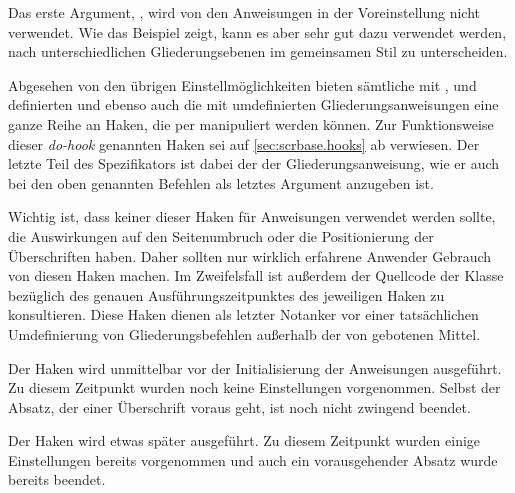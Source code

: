 Das erste Argument, , wird von den Anweisungen in der
Voreinstellung nicht verwendet. Wie das Beispiel zeigt, kann es aber sehr gut
dazu verwendet werden, nach unterschiedlichen Gliederungsebenen im gemeinsamen
Stil  zu unterscheiden.%
\EndIndexGroup


\begin{Declaration}
%
%
%
%
%
%
\end{Declaration}
%
Abgesehen von den übrigen Einstellmöglichkeiten bieten sämtliche mit
,
 und
 definierten und ebenso auch die
mit  umdefinierten
Gliederungsanweisungen eine ganze Reihe an Haken, die per
 manipuliert werden können. Zur
Funktionsweise dieser \emph{do-hook} genannten Haken sei auf
\autoref{sec:scrbase.hooks} ab  verwiesen. Der
letzte Teil des Spezifikators ist dabei der  der
Gliederungsanweisung, wie er auch bei den oben genannten Befehlen als letztes
Argument anzugeben ist.

Wichtig ist, dass keiner dieser Haken für Anweisungen
verwendet werden sollte, die Auswirkungen auf den Seitenumbruch oder die
Positionierung der Überschriften haben. Daher sollten nur wirklich erfahrene
Anwender Gebrauch von diesen Haken machen. Im Zweifelsfall ist außerdem der
Quellcode der Klasse bezüglich des genauen Ausführungszeitpunktes des
jeweiligen Haken zu konsultieren. Diese Haken dienen als letzter Notanker vor
einer tatsächlichen Umdefinierung von Gliederungsbefehlen außerhalb der von
\KOMAScript{} gebotenen Mittel.

Der Haken
 wird unmittelbar vor der
Initialisierung der Anweisungen ausgeführt. Zu diesem Zeitpunkt wurden noch
keine Einstellungen vorgenommen. Selbst der Absatz, der einer Überschrift
voraus geht, ist noch nicht zwingend beendet.

Der Haken
 wird etwas später ausgeführt. Zu
diesem Zeitpunkt wurden einige Einstellungen bereits vorgenommen und auch ein
vorausgehender Absatz wurde bereits beendet.

